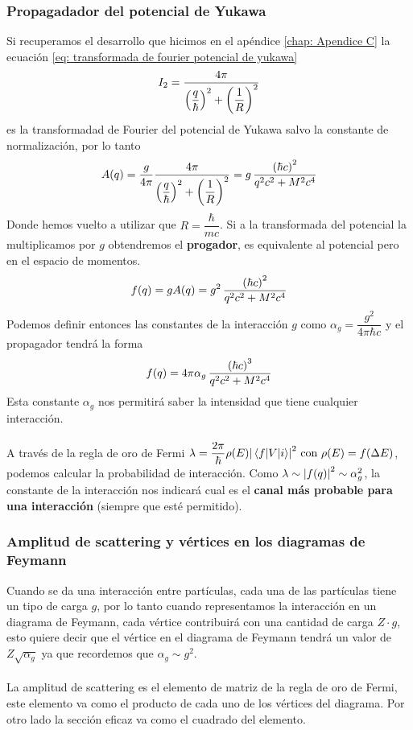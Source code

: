 \subsubsection{Propagadador del potencial de Yukawa}
Si recuperamos el desarrollo que hicimos en el apéndice \ref{chap: Apendice C} la ecuación \ref{eq: transformada de fourier potencial de yukawa} 
$$I_2=\dfrac{4\pi}{\qty(\dfrac{q}{\hbar})^2+\qty(\dfrac{1}{R})^2}$$
es la transformadad de Fourier del potencial de Yukawa salvo la constante de normalización, por lo tanto
\begin{equation}
    A(q)=\frac{g}{4\pi} \dfrac{4\pi}{\qty(\dfrac{q}{\hbar})^2+\qty(\dfrac{1}{R})^2}=g \,\dfrac{\qty(\hbar c)^2}{q^2c^2+M^2c^4}
\end{equation}
Donde hemos vuelto a utilizar que $R=\dfrac{\hbar}{mc}$. Si a la transformada del potencial la multiplicamos por $g$ obtendremos el \textbf{progador}, es equivalente al potencial pero en el espacio de momentos.
\begin{equation}
    f(q)=gA(q)=g^2 \,\dfrac{\qty(\hbar c)^2}{q^2c^2+M^2c^4}
\end{equation}
Podemos definir entonces las constantes de la interacción $g$ como $\alpha_g=\dfrac{g^2}{4\pi \hbar c}$ y el propagador tendrá la forma
\begin{equation}
     f(q)=4\pi \alpha_g\,\dfrac{\qty(\hbar c)^3}{q^2c^2+M^2c^4}
     \label{eq: propagador de yukawa}
\end{equation}
Esta constante $\alpha_g$ nos permitirá saber la intensidad que tiene cualquier interacción. \\\\
A través de la regla de oro de Fermi $\lambda=\dfrac{2\pi}{\hbar} \rho(E) \abs{\mel{f}{V}{i}}^2 \ \text{con} \ \rho(E)=f(\Delta E)$, podemos calcular la  probabilidad de interacción. Como $\lambda\sim \abs{f(q)}^2\sim \alpha_g^2$, la constante de la interacción nos indicará cual es el \textbf{canal más probable para una interacción} (siempre que esté permitido).
\subsubsection{Amplitud de scattering y vértices en los diagramas de Feymann}
Cuando se da una interacción entre partículas, cada una de las partículas tiene un tipo de carga $g$, por lo tanto cuando representamos la interacción en un diagrama de Feymann, cada vértice contribuirá con una cantidad de carga $Z\cdot g$, esto quiere decir que el vértice en el diagrama de Feymann tendrá un valor de $Z\sqrt{\alpha_g}$ ya que recordemos que $\alpha_g\sim g^2$.\\\\
La amplitud de scattering es el elemento de matriz de la regla de oro de Fermi, este elemento va como el producto de cada uno de los vértices del diagrama. Por otro lado la sección eficaz va como el cuadrado del elemento.


